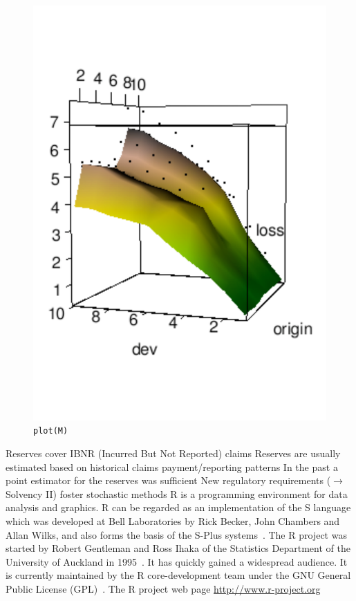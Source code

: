\documentclass[a4paper]{article}
\begin{document}
\begin{figure}[h]
  \begin{center}
\includegraphics{Fancy3d}
    \caption{\texttt{plot(M)}}
  \end{center}
\end{figure}
\pagebreak

Reserves cover IBNR (Incurred But Not
Reported) claims Reserves are usually estimated based on
historical claims payment/reporting patterns  In the past a point estimator for the reserves
was sufficient New regulatory requirements ($\to$ Solvency II)
foster stochastic methods
R is a programming environment for data analysis and graphics.
R can be regarded as an implementation of
the S language which was developed at Bell Laboratories by Rick Becker,
John Chambers and Allan Wilks, and also forms the basis of the
S-Plus systems~\cite{splus}.
The R project was started by Robert Gentleman and Ross Ihaka of the Statistics
Department of the University of Auckland in 1995~\cite{IhakaGentelman1996}.
It has quickly gained a widespread audience. It is currently maintained by
the R core-development team under the GNU General Public License
(GPL)~\cite{GNU}.
The R project web page
\url{http://www.r-project.org}
\end{document}
